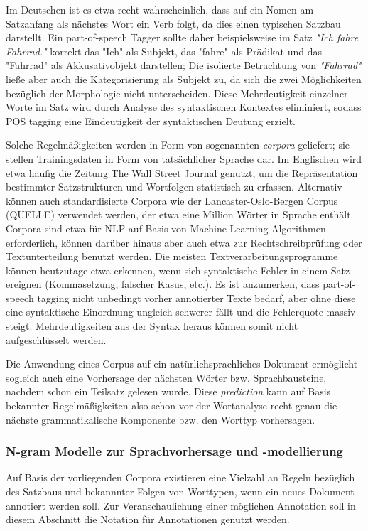 \documentclass[12pt]{paper}
\begin{document}
Im Deutschen ist es etwa recht wahrscheinlich, dass auf ein Nomen am Satzanfang als nächstes Wort ein Verb folgt, da dies einen typischen Satzbau darstellt. Ein part-of-speech Tagger sollte daher beispielsweise im Satz \textit{"Ich fahre Fahrrad."} korrekt das "Ich" als Subjekt, das "fahre" als Prädikat und das "Fahrrad" als Akkusativobjekt darstellen; Die isolierte Betrachtung von \textit{"Fahrrad"} ließe aber auch die Kategorisierung als Subjekt zu, da sich die zwei Möglichkeiten bezüglich der Morphologie nicht unterscheiden. Diese Mehrdeutigkeit einzelner Worte im Satz wird durch Analyse des syntaktischen Kontextes eliminiert, sodass POS tagging eine Eindeutigkeit der syntaktischen Deutung erzielt.

Solche Regelmäßigkeiten werden in Form von sogenannten \textit{corpora} geliefert; sie stellen Trainingsdaten in Form von tatsächlicher Sprache dar. Im Englischen wird etwa häufig die Zeitung The Wall Street Journal genutzt, um die Repräsentation bestimmter Satzstrukturen und Wortfolgen statistisch zu erfassen. Alternativ können auch standardisierte Corpora wie der Lancaster-Oslo-Bergen Corpus (QUELLE) verwendet werden, der etwa eine Million Wörter in Sprache enthält. Corpora sind etwa für NLP auf Basis von Machine-Learning-Algorithmen erforderlich, können darüber hinaus aber auch etwa zur Rechtschreibprüfung oder Textunterteilung benutzt werden. Die meisten Textverarbeitungsprogramme können heutzutage etwa erkennen, wenn sich syntaktische Fehler in einem Satz ereignen (Kommasetzung, falscher Kasus, etc.). Es ist anzumerken, dass part-of-speech tagging nicht unbedingt vorher annotierter Texte bedarf, aber ohne diese eine syntaktische Einordnung ungleich schwerer fällt und die Fehlerquote massiv steigt. Mehrdeutigkeiten aus der Syntax heraus können somit nicht aufgeschlüsselt werden.

Die Anwendung eines Corpus auf ein natürlichsprachliches Dokument ermöglicht sogleich auch eine Vorhersage der nächsten Wörter bzw. Sprachbausteine, nachdem schon ein Teilsatz gelesen wurde. Diese \textit{prediction} kann auf Basis bekannter Regelmäßigkeiten also schon vor der Wortanalyse recht genau die nächste grammatikalische Komponente bzw. den Worttyp vorhersagen.

\subsubsection{N-gram Modelle zur Sprachvorhersage und -modellierung}
Auf Basis der vorliegenden Corpora existieren eine Vielzahl an Regeln bezüglich des Satzbaus und bekannnter Folgen von Worttypen, wenn ein neues Dokument annotiert werden soll. Zur Veranschaulichung einer möglichen Annotation soll in diesem Abschnitt die Notation \cite{clw7} für Annotationen genutzt werden.
\end{document}
